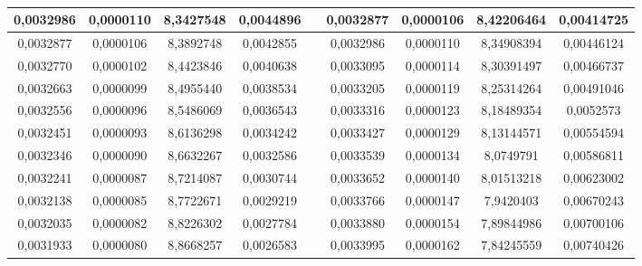\documentclass[11pt]{article}
\begin{document}
\begin{table}[h]
\begin{tabular}{|c|c|c|c|c|c|c|c|c|}
0,0032986               & 0,0000110                        & 8,3427548 & 0,0044896             &  & 0,0032877               & 0,0000106                        & 8,42206464 & 0,00414725            \\ \hline
0,0032877               & 0,0000106                        & 8,3892748 & 0,0042855             &  & 0,0032986               & 0,0000110                        & 8,34908394 & 0,00446124            \\ \hline
0,0032770               & 0,0000102                        & 8,4423846 & 0,0040638             &  & 0,0033095               & 0,0000114                        & 8,30391497 & 0,00466737            \\ \hline
0,0032663               & 0,0000099                        & 8,4955440 & 0,0038534             &  & 0,0033205               & 0,0000119                        & 8,25314264 & 0,00491046            \\ \hline
0,0032556               & 0,0000096                        & 8,5486069 & 0,0036543             &  & 0,0033316               & 0,0000123                        & 8,18489354 & 0,0052573             \\ \hline
0,0032451               & 0,0000093                        & 8,6136298 & 0,0034242             &  & 0,0033427               & 0,0000129                        & 8,13144571 & 0,00554594            \\ \hline
0,0032346               & 0,0000090                        & 8,6632267 & 0,0032586             &  & 0,0033539               & 0,0000134                        & 8,0749791  & 0,00586811            \\ \hline
0,0032241               & 0,0000087                        & 8,7214087 & 0,0030744             &  & 0,0033652               & 0,0000140                        & 8,01513218 & 0,00623002            \\ \hline
0,0032138               & 0,0000085                        & 8,7722671 & 0,0029219             &  & 0,0033766               & 0,0000147                        & 7,9420403  & 0,00670243            \\ \hline
0,0032035               & 0,0000082                        & 8,8226302 & 0,0027784             &  & 0,0033880               & 0,0000154                        & 7,89844986 & 0,00700106            \\ \hline
0,0031933               & 0,0000080                        & 8,8668257 & 0,0026583             &  & 0,0033995               & 0,0000162                        & 7,84245559 & 0,00740426            \\ \hline
\end{tabular}
\caption{}
\end{table}
\end{document}
